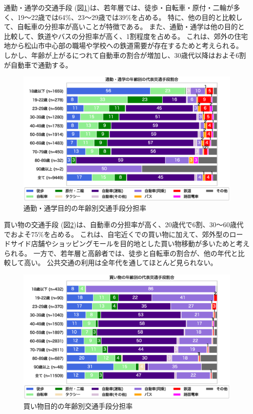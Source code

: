 \documentclass[a4paper,12pt, uplatex]{jsbook}
\begin{document}
通勤・通学の交通手段 (図\ref{fig:mode_share_commute})は、若年層では、徒歩・自転車・原付・二輪が多く、19〜22歳では64\%、23〜29歳では39\%を占める。
特に、他の目的と比較して、自転車の分担率が高いことが特徴である。
また、通勤・通学は他の目的と比較して、鉄道やバスの分担率が高く、1割程度を占める。
これは、郊外の住宅地から松山市中心部の職場や学校への鉄道需要が存在するためと考えられる。
しかし、年齢が上がるにつれて自動車の割合が増加し、30歳代以降はおよそ6割が自動車で通勤する。
%
\begin{figure}[htbp]
    \centering
    \includegraphics[width=1.0\textwidth]{picture/mode_share_通勤通学_age.eps}
    \caption{通勤・通学目的の年齢別交通手段分担率}
    \label{fig:mode_share_commute}
\end{figure}

買い物の交通手段 (図\ref{fig:mode_share_shopping})は、自動車の分担率が高く、20歳代で6割、30〜60歳代でおよそ75\%を占める。
これは、自宅近くでの買い物に加えて、郊外型のロードサイド店舗やショッピングモールを目的地とした買い物移動が多いためと考えられる。
一方で、若年層と高齢者では、徒歩と自転車の割合が、他の年代と比較して高い。
公共交通の利用は全年代を通してほとんど見られない。
%
\begin{figure}[htbp]
    \centering
    \includegraphics[width=1.0\textwidth]{picture/mode_share_買い物_age.eps}
    \caption{買い物目的の年齢別交通手段分担率}
    \label{fig:mode_share_shopping}
\end{figure}
\end{document}
